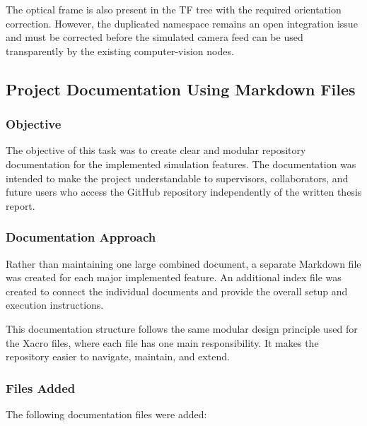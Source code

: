 \documentclass{article}
\begin{document}
The optical frame is also present in the TF tree with the required orientation correction. However, the duplicated namespace remains an open integration issue and must be corrected before the simulated camera feed can be used transparently by the existing computer-vision nodes.


\subsection{Project Documentation Using Markdown Files}
\label{sec:project_documentation}

\subsubsection{Objective}

The objective of this task was to create clear and modular repository documentation for the implemented simulation features. The documentation was intended to make the project understandable to supervisors, collaborators, and future users who access the GitHub repository independently of the written thesis report.

\subsubsection{Documentation Approach}

Rather than maintaining one large combined document, a separate Markdown file was created for each major implemented feature. An additional index file was created to connect the individual documents and provide the overall setup and execution instructions.

This documentation structure follows the same modular design principle used for the Xacro files, where each file has one main responsibility. It makes the repository easier to navigate, maintain, and extend.

\subsubsection{Files Added}

The following documentation files were added:
\end{document}
